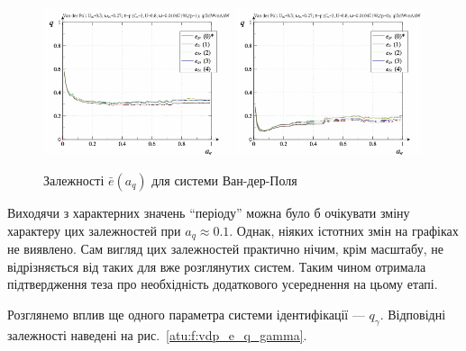 \begin{figure}[ht!]
\begin{center}
  \includegraphics[width=0.49\textwidth]{p/cha/vdp/vdp_id-p_a_q_sign.png}
  \hfill
  \includegraphics[width=0.49\textwidth]{p/cha/vdp/vdp_id-p_a_q_sin.png}
\end{center}
  \caption{Залежності $\bar{e}(a_q)$ для системи Ван-дер-Поля}
\label{atu:f:vdp_e_a_q}
\end{figure}

Виходячи з характерних значень ``періоду'' можна було б очікувати
зміну характеру цих залежностей при
$ a_q \approx 0.1 $. Однак, ніяких істотних змін на графіках не
виявлено. Сам вигляд цих залежностей практично нічим, крім
масштабу, не відрізняється від таких для вже розглянутих
систем. Таким чином отримала підтвердження теза про необхідність
додаткового усереднення на цьому етапі.

Розглянемо вплив ще одного параметра системи ідентифікації ---
$ q_\gamma $. Відповідні залежності наведені на рис.~\ref{atu:f:vdp_e_q_gamma}.

